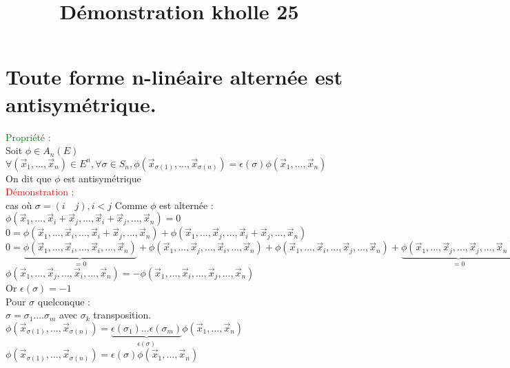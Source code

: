 \documentclass{article}
\begin{document}
\title{Démonstration kholle 25}
\date{}
\maketitle
\renewcommand{\thesection}{\Roman{section}}
	\setlength{\parindent}{1.5cm}
	\section{Toute forme n-linéaire alternée est antisymétrique.}
	\textcolor{green}{Propriété :} \\
	Soit $\phi \in A_n(E)$ \\
	$\forall (\vec x_1,...,\vec x_n) \in E^n, \forall \sigma \in S_n, \phi(\vec x_{\sigma(1)},...,\vec x_{\sigma(n)})=\epsilon(\sigma) \phi(\vec x_1,...,\vec x_n)$ \\
	On dit que $\phi$ est antisymétrique \\
	\textcolor{red}{Démonstration :} \\
	cas où $\sigma =(i \quad  j), i<j$ Comme $\phi$ est alternée : \\
	$\phi(\vec x_1,..., \vec x_i + \vec x_j,..., \vec x_i + \vec x_j,...,\vec x_n)=0$ \\
	$0=\phi(\vec x_1,..., \vec x_i,..., \vec x_i + \vec x_j,...,\vec x_n)+\phi(\vec x_1,...,  \vec x_j,..., \vec x_i + \vec x_j,...,\vec x_n) $ \\
	$0=\underbrace{\phi(\vec x_1,..., \vec x_i,..., \vec x_i ,...,\vec x_n)}_{=0}+\phi(\vec x_1,...,  \vec x_j,..., \vec x_i ,...,\vec x_n)+\phi(\vec x_1,..., \vec x_i,...,  \vec x_j,...,\vec x_n)+\underbrace{\phi(\vec x_1,...,  \vec x_j,..., \vec x_j,...,\vec x_n)}_{=0}$ \\
	$\phi(\vec x_1,..., \vec x_j,...,  \vec x_i,...,\vec x_n)=-\phi(\vec x_1,...,  \vec x_i,..., \vec x_j ,...,\vec x_n)$ \\
	Or $\epsilon(\sigma)=-1$ \\
	Pour $\sigma $ quelconque : \\
	$\sigma= \sigma_1 .... \sigma_m$ avec $\sigma_k$ transposition. \\
	$\phi(\vec x_{\sigma(1)},..., \vec x_{\sigma(n)})=\underbrace{\epsilon(\sigma_1)... \epsilon(\sigma_m)}_{\epsilon(\sigma)} \phi(\vec x_1,..., \vec x_n)$ \\
	$\phi(\vec x_{\sigma(1)},...,\vec x_{\sigma(n)})=\epsilon(\sigma) \phi(\vec x_1,...,\vec x_n)$
\end{document}

